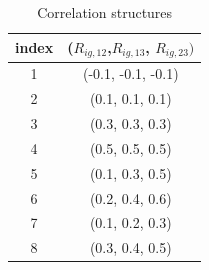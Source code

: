 \documentclass[12pt]{article}
\begin{document}
\begin{center}
\end{center}


\begin{table}[htbp]
\begin{center}
\caption{Correlation structures}
\vspace{.1in}
\label{ta:sample}
\begin{tabular}{c|c} 
index  & ($R_{ig,12}$,$R_{ig,13}$, $R_{ig,23})$\\
\hline
1 & (-0.1, -0.1, -0.1) \\
2 &  (0.1,  0.1,  0.1) \\
3 &  (0.3,  0.3,  0.3) \\
4 &  (0.5,  0.5,  0.5) \\
5 &  (0.1,  0.3,  0.5) \\
6 &  (0.2,  0.4,  0.6) \\
7 &  (0.1,  0.2,  0.3) \\
8 &  (0.3,  0.4,  0.5)\\
\hline
\end{tabular}
\end{center}
\end{table}
\end{document}
